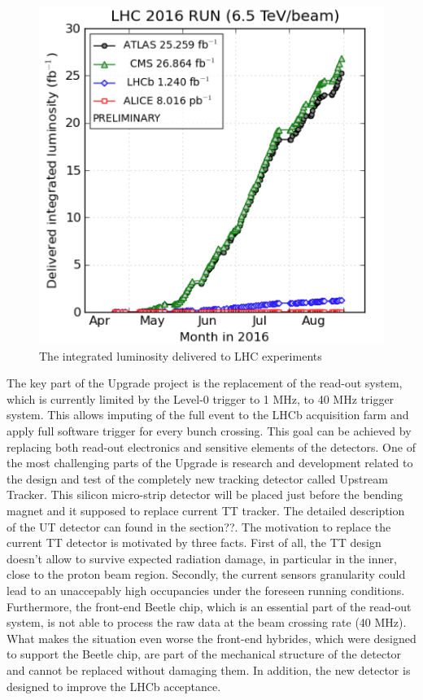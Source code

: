 \begin{figure}
\centering
\includegraphics[scale=0.3]{figures/Luminosity.png}
\caption[Luminosity]{The integrated luminosity delivered to LHC experiments
\label{fig:Luminosity}}
\end{figure}

The key part of the Upgrade project is the replacement of the read-out system, which is currently limited by the Level-0 trigger to 1 MHz, to 40 MHz trigger system. This allows imputing of the full event to the LHCb acquisition farm and apply full software trigger for every bunch crossing. 
This goal can be achieved by replacing both read-out electronics and sensitive elements of the detectors. One of the most challenging parts of the Upgrade is research and development related to the design and test of the completely new tracking detector called Upstream Tracker. This silicon micro-strip detector will be placed just before the bending magnet and it supposed to replace current TT tracker. The detailed description of the UT detector can found in the section??.  The motivation to replace the current TT detector is motivated by three facts. First of all, the TT design doesn’t allow to survive expected radiation damage, in particular in the inner, close to the proton beam region. Secondly, the current sensors granularity could lead to an unaccepably high occupancies under the foreseen running conditions. Furthermore, the front-end Beetle chip, which is an essential part of the read-out system, is not able to process the raw data at the beam crossing rate (40 MHz). What makes the situation even worse the front-end hybrides, which were designed to support the Beetle chip, are part of the mechanical structure of the detector and cannot be replaced without damaging them. In addition, the new detector is designed to improve the LHCb acceptance.  

